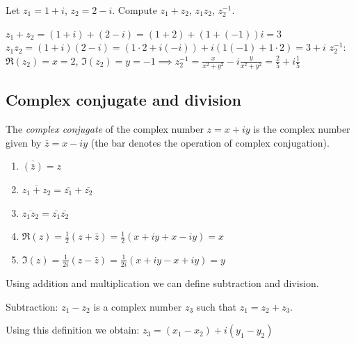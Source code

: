 \begin{example}
 Let $z_1=1+i$, $z_2 = 2-i$. Compute $z_1+z_2$, $z_1z_2$, $z_2^{-1}$.

\begin{soln} 
$z_1+z_2 = (1+i)+(2-i)=(1+2)+(1+(-1))i = 3$
$z_1z_2 = (1+i)(2-i) = (1 \cdot 2 + i(-i)) + i (1(-1)+1\cdot 2) = 3+i$
$z_2^{-1}$: $\Re(z_2) = x=2$, $\Im(z_2) = y=-1 \implies z_2^{-1} = \frac{x}{x^2+y^2} -i \frac{y}{x^2+y^2} = \frac{2}{5} + i \frac{1}{5}$
\end{soln}
\end{example}

\subsection{Complex conjugate and division}

\begin{definition}
The \emph{complex conjugate} of the complex number $z = x + iy$ is the complex number given by $\bar{z} = x - iy$ (the bar denotes the operation of complex conjugation).
\end{definition}

\begin{remark}
\begin{enumerate}
    \item $\overline{(\bar{z})} = z$
    \item $\overline{z_1 + z_2} = \bar{z_1} + \bar{z_2}$
    \item $\overline{z_1 z_2} = \bar{z_1} \bar{z_2}$
    \item $\Re(z) = \frac{1}{2}(z + \bar{z}) = \frac{1}{2}(x + iy + x - iy) = x$
    \item $\Im(z) = \frac{1}{2i}(z - \bar{z}) = \frac{1}{2i}(x + iy - x + iy) = y$
\end{enumerate}
\end{remark}

Using addition and multiplication we can define subtraction and division.
\begin{definition}
Subtraction: $z_1-z_2$ is a complex number $z_3$ such that $z_1 = z_2+z_3$.
\end{definition}
Using this definition we obtain: $z_3 = (x_1-x_2) + i(y_1-y_2)$

